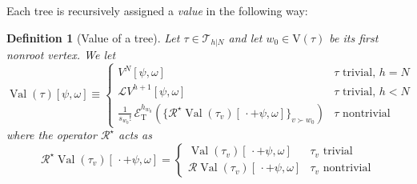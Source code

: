 \documentclass[a4paper, 11pt]{article}
\newcommand{\sing}[2]{{#1}^{#2}}							%
\newcommand{\loc}{\mathcal{L}}								%
\newcommand{\ren}{\mathcal{R}}								%
\newcommand{\vrt}{\mathrm{V}}								%
\newcommand{\trees}{\mathcal{T}}							%
\newcommand{\TExp}[1]{\mathcal{E}^{#1}_%
{\scriptscriptstyle{\mathrm{T}}}}							%
\DeclareMathOperator{\val}{Val}								%
\theoremstyle{thm}
\newtheorem{defn}{Definition}
\begin{document}
Each tree is recursively assigned a \emph{value} in the following way:
\begin{defn}[Value of a tree]
\label{def:tree_value}
Let $\tau \in \trees_{h|N}$ and let $w_0 \in \vrt(\tau)$ be its first nonroot vertex. We let
\begin{equation}
\val(\tau)[\psi, \omega] \equiv
\begin{cases}
\sing{V}{N}[\psi, \omega]			& \tau \text{ trivial}, \, h = N \\
\loc \sing{V}{h+1}[\psi, \omega]	& \tau \text{ trivial}, \, h < N \\[3pt]
\displaystyle \frac{1}{s_{w_0}!} \, \TExp{h_{w_0}}( \lbrace \ren^\star \val(\tau_v)[\, \cdot + \psi, \omega] \rbrace_{v \succ w_0} )		& \tau \text{ nontrivial}
\end{cases}
\end{equation}
where the operator $\ren^\star$ acts as
\begin{equation}
\ren^\star \val(\tau_v)[\, \cdot + \psi, \omega] =
\begin{cases}
\val(\tau_v)[\, \cdot + \psi, \omega]		&	\tau_v \text{ trivial} \\
\ren \val(\tau_v)[\, \cdot + \psi, \omega]	&	\tau_v \text{ nontrivial}
\end{cases}
\end{equation}
\end{defn}
\end{document}

